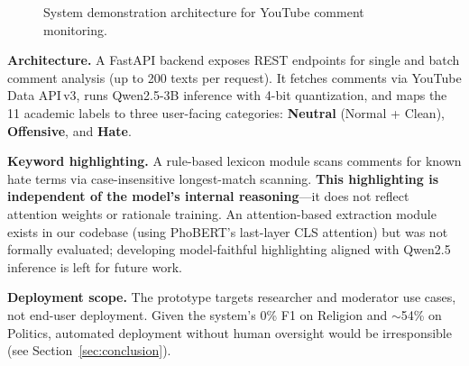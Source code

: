 \documentclass[conference]{IEEEtran}
\begin{document}
\begin{figure}[ht]
\centering
{}
\caption{System demonstration architecture for YouTube comment monitoring.}
\label{fig:system}
\end{figure}

\textbf{Architecture.} A FastAPI backend exposes REST endpoints for single and
batch comment analysis (up to 200 texts per request). It fetches comments via
YouTube Data API\,v3, runs Qwen2.5-3B inference with 4-bit quantization, and
maps the 11 academic labels to three user-facing categories: \textbf{Neutral}
(Normal + Clean), \textbf{Offensive}, and \textbf{Hate}.

\textbf{Keyword highlighting.} A rule-based lexicon module scans comments for
known hate terms via case-insensitive longest-match scanning. \textbf{This
highlighting is independent of the model's internal reasoning}---it does not
reflect attention weights or rationale training. An attention-based extraction
module exists in our codebase (using PhoBERT's last-layer CLS attention) but was
not formally evaluated; developing model-faithful highlighting aligned with
Qwen2.5 inference is left for future work.

\textbf{Deployment scope.} The prototype targets researcher and moderator use
cases, not end-user deployment. Given the system's 0\% F1 on Religion and
${\sim}$54\% on Politics, automated deployment without human oversight would be
irresponsible (see Section~\ref{sec:conclusion}).
\end{document}
